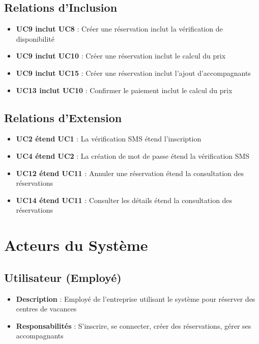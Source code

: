 \documentclass[12pt,a4paper]{article}
\begin{document}
\subsection{Relations d'Inclusion}
\begin{itemize}
    \item \textbf{UC9 inclut UC8} : Créer une réservation inclut la vérification de disponibilité
    \item \textbf{UC9 inclut UC10} : Créer une réservation inclut le calcul du prix
    \item \textbf{UC9 inclut UC15} : Créer une réservation inclut l'ajout d'accompagnants
    \item \textbf{UC13 inclut UC10} : Confirmer le paiement inclut le calcul du prix
\end{itemize}

\subsection{Relations d'Extension}
\begin{itemize}
    \item \textbf{UC2 étend UC1} : La vérification SMS étend l'inscription
    \item \textbf{UC4 étend UC2} : La création de mot de passe étend la vérification SMS
    \item \textbf{UC12 étend UC11} : Annuler une réservation étend la consultation des réservations
    \item \textbf{UC14 étend UC11} : Consulter les détails étend la consultation des réservations
\end{itemize}

\section{Acteurs du Système}

\subsection{Utilisateur (Employé)}
\begin{itemize}
    \item \textbf{Description} : Employé de l'entreprise utilisant le système pour réserver des centres de vacances
    \item \textbf{Responsabilités} : S'inscrire, se connecter, créer des réservations, gérer ses accompagnants
\end{itemize}
\end{document}
